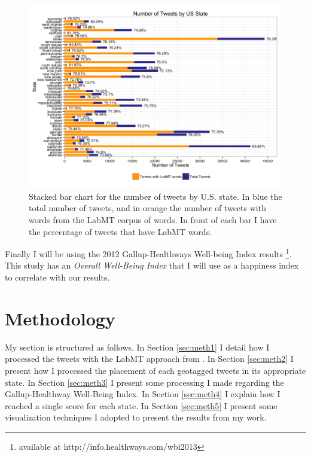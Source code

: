 \documentclass{llncs}
\begin{document}
\begin{figure}
\centering
\includegraphics[width=\textwidth]{images/tweets_by_state}
\caption{Stacked bar chart for the number of tweets by U.S. state. In blue the total number of tweets, and in orange the number of tweets with words from the LabMT corpus of words. In front of each bar I have the percentage of tweets that have LabMT words.}
\label{fig:tweets_by_state}
\end{figure}

Finally I will be using the 2012 Gallup-Healthways Well-being Index results \cite{GallupHealthway2013} \footnote{available at http://info.healthways.com/wbi2013}. This study has an \emph{Overall Well-Being Index} that I will use as a happiness index to correlate with our results.

\FloatBarrier
\section{Methodology}
\label{sec:meth}
My section is structured as follows. In Section \ref{sec:meth1} I detail how I processed the tweets with the LabMT approach from \cite{Dodds2011}. In Section \ref{sec:meth2} I present how I processed the placement of each geotagged tweets in its appropriate state. In Section \ref{sec:meth3} I present some processing I made regarding the Gallup-Healthway Well-Being Index. In Section \ref{sec:meth4} I explain how I reached a single score for each state. In Section \ref{sec:meth5} I present some visualization techniques I adopted to present the results from my work.
\end{document}
